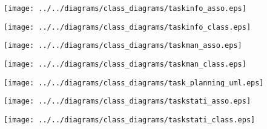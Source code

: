     \begin{frame}
    \begin{center}
    \texttt{[image: ../../diagrams/class\_diagrams/taskinfo\_asso.eps]}
    \end{center}
    \end{frame}
    

    \begin{frame}
    \begin{center}
    \texttt{[image: ../../diagrams/class\_diagrams/taskinfo\_class.eps]}
    \end{center}
    \end{frame}
    

    \begin{frame}
    \begin{center}
    \texttt{[image: ../../diagrams/class\_diagrams/taskman\_asso.eps]}
    \end{center}
    \end{frame}
    

    \begin{frame}
    \begin{center}
    \texttt{[image: ../../diagrams/class\_diagrams/taskman\_class.eps]}
    \end{center}
    \end{frame}
    

    \begin{frame}
    \begin{center}
    \texttt{[image: ../../diagrams/class\_diagrams/task\_planning\_uml.eps]}
    \end{center}
    \end{frame}
    

    \begin{frame}
    \begin{center}
    \texttt{[image: ../../diagrams/class\_diagrams/taskstati\_asso.eps]}
    \end{center}
    \end{frame}
    

    \begin{frame}
    \begin{center}
    \texttt{[image: ../../diagrams/class\_diagrams/taskstati\_class.eps]}
    \end{center}
    \end{frame}
    

